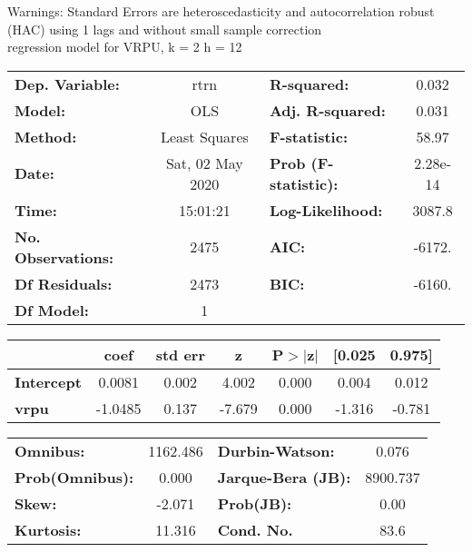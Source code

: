 Warnings: \newline
 [1] Standard Errors are heteroscedasticity and autocorrelation robust (HAC) using 1 lags and without small sample correction\\ 

regression model for VRPU, k = 2 h = 12\begin{center}
\begin{tabular}{lclc}
\toprule
\textbf{Dep. Variable:}    &       rtrn       & \textbf{  R-squared:         } &     0.032   \\
\textbf{Model:}            &       OLS        & \textbf{  Adj. R-squared:    } &     0.031   \\
\textbf{Method:}           &  Least Squares   & \textbf{  F-statistic:       } &     58.97   \\
\textbf{Date:}             & Sat, 02 May 2020 & \textbf{  Prob (F-statistic):} &  2.28e-14   \\
\textbf{Time:}             &     15:01:21     & \textbf{  Log-Likelihood:    } &    3087.8   \\
\textbf{No. Observations:} &        2475      & \textbf{  AIC:               } &    -6172.   \\
\textbf{Df Residuals:}     &        2473      & \textbf{  BIC:               } &    -6160.   \\
\textbf{Df Model:}         &           1      & \textbf{                     } &             \\
\bottomrule
\end{tabular}
\begin{tabular}{lcccccc}
                   & \textbf{coef} & \textbf{std err} & \textbf{z} & \textbf{P$> |$z$|$} & \textbf{[0.025} & \textbf{0.975]}  \\
\midrule
\textbf{Intercept} &       0.0081  &        0.002     &     4.002  &         0.000        &        0.004    &        0.012     \\
\textbf{vrpu}      &      -1.0485  &        0.137     &    -7.679  &         0.000        &       -1.316    &       -0.781     \\
\bottomrule
\end{tabular}
\begin{tabular}{lclc}
\textbf{Omnibus:}       & 1162.486 & \textbf{  Durbin-Watson:     } &    0.076  \\
\textbf{Prob(Omnibus):} &   0.000  & \textbf{  Jarque-Bera (JB):  } & 8900.737  \\
\textbf{Skew:}          &  -2.071  & \textbf{  Prob(JB):          } &     0.00  \\
\textbf{Kurtosis:}      &  11.316  & \textbf{  Cond. No.          } &     83.6  \\
\bottomrule
\end{tabular}
\end{center}

